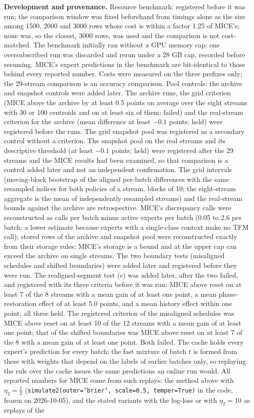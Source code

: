 \documentclass[11pt]{article}
\theoremstyle{plain}
\theoremstyle{definition}
\theoremstyle{remark}
\newcommand{\method}{\textsc{MICE}}   %
\begin{document}
\textbf{Development and provenance.} Resource benchmark: registered before it was run; the comparison window was fixed beforehand from timings alone as the size among 1500, 2000 and 3000 rows whose cost is within a factor 1.25 of MICE's; none was, so the closest, 3000 rows, was used and the comparison is not cost-matched. The benchmark initially ran without a GPU memory cap; one oversubscribed run was discarded and rerun under a 28 GB cap, recorded before resuming. MICE's expert predictions in the benchmark are bit-identical to those behind every reported number. Costs were measured on the three prefixes only; the 29-stream comparison is an accuracy comparison. Pool controls: the archive and snapshot controls were added later. The archive runs, the grid criterion (MICE above the archive by at least 0.5 points on average over the eight streams with 30 or 100 centroids and on at least six of them; failed) and the real-stream criterion for the archive (mean difference at least $-0.1$ points; held) were registered before the runs. The grid snapshot pool was registered as a secondary control without a criterion. The snapshot pool on the real streams and its descriptive threshold (at least $-0.1$ points; held) were registered after the 29 streams and the MICE results had been examined, so that comparison is a control added later and not an independent confirmation. The grid intervals (moving-block bootstrap of the aligned per-batch differences with the same resampled indices for both policies of a stream, blocks of 10; the eight-stream aggregate is the mean of independently resampled streams) and the real-stream bounds against the archive are retrospective. MICE's discrepancy calls were reconstructed as calls per batch minus active experts per batch (0.05 to 2.6 per batch; a lower estimate because experts with a single-class context make no TFM call); stored rows of the archive and snapshot pool were reconstructed exactly from their storage rules; MICE's storage is a bound and at the upper cap can exceed the archive on single streams. The two boundary tests (misaligned schedules and shifted boundaries) were added later and registered before they were run. The realigned-segment test (c) was added later, after the two failed, and registered with its three criteria before it was run: \method{} above reset on at least 7 of the 8 streams with a mean gain of at least one point, a mean phase-restoration effect of at least 5.0 points, and a mean history effect within one point; all three held. The registered criterion of the misaligned schedules was MICE above reset on at least 10 of the 12 streams with a mean gain of at least one point; that of the shifted boundaries was MICE above reset on at least 7 of the 8 with a mean gain of at least one point. Both failed. The cache holds every expert's prediction for every batch; the fast mixture of batch $t$ is formed from these with weights that depend on the labels of earlier batches only, so replaying the rule over the cache issues the same predictions an online run would. All reported numbers for \method{} come from such replays: the method above with $\eta_2=\tfrac12$ (\texttt{simulate2(outer='brier', scale=0.5, temper=True)} in the code, frozen on 2026-10-05), and the stated variants with the log-loss or with $\eta_2=10$ as replays of the 
\end{document}
